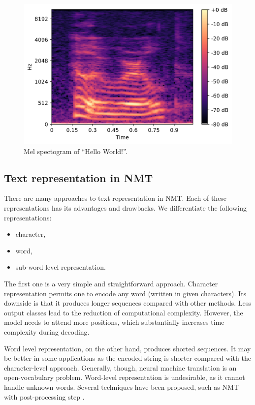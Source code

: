 \begin{figure}[h]
	\centering
	\includegraphics[width=0.8\linewidth]{img/mel.png}
	\caption{Mel spectogram of ``Hello World!''.}
	\label{fig:mel}
\end{figure}

\subsection{Text representation in NMT}

There are many approaches to text representation in NMT. Each of these representations has its advantages and drawbacks. We differentiate the following representations:

\begin{itemize}
	\item character,
	\item word,
	\item sub-word level representation.
\end{itemize}

The first one is a very simple and straightforward approach. Character representation permits one to encode any word (written in given characters). Its downside is that it produces longer sequences compared with other methods. Less output classes lead to the reduction of computational complexity. However, the model needs to attend more positions, which substantially increases time complexity during decoding.

Word level representation, on the other hand, produces shorted sequences. It may be better in some applications as the encoded string is shorter compared with the character-level approach. Generally, though, neural machine translation is an open-vocabulary problem. Word-level representation is undesirable, as it cannot handle unknown words. Several techniques have been proposed, such as NMT with post-processing step .

